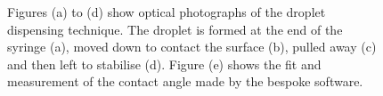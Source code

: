 \begin{figure}
\begin{center}
\end{center}
\caption[Droplet dispensing for contact angle measurement]{\label{fig:contact_angles}Figures (a) to (d) show optical photographs of the droplet dispensing technique. The droplet is formed at the end of the syringe (a), moved down to contact the surface (b), pulled away (c) and then left to stabilise (d). Figure (e) shows the fit and measurement of the contact angle made by the bespoke software.}
\end{figure}

